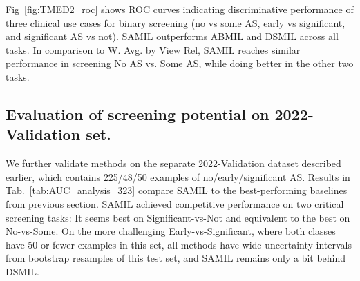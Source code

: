 

Fig~\ref{fig:TMED2_roc} shows ROC curves indicating discriminative performance of three clinical use cases for binary screening (no vs some AS, early vs significant, and significant AS vs not). SAMIL outperforms ABMIL and DSMIL across all tasks. 
In comparison to W. Avg. by View Rel, SAMIL reaches similar performance in screening No AS vs. Some AS, while doing better in the other two tasks.



\subsection{Evaluation of screening potential on 2022-Validation set.}
We further validate methods on the separate 2022-Validation dataset described earlier, which contains 225/48/50 examples of no/early/significant AS. 
Results in Tab.~\ref{tab:AUC_analysis_323}
compare SAMIL to the best-performing baselines from previous section. 
SAMIL achieved competitive performance on two critical screening tasks: It seems best on Significant-vs-Not and equivalent to the best on No-vs-Some. On the more challenging Early-vs-Significant, where both classes have 50 or fewer examples in this set, all methods have wide uncertainty intervals from bootstrap resamples of this test set, and SAMIL remains only a bit behind DSMIL.


